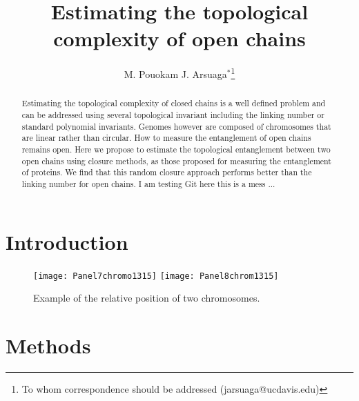 \documentclass{iopart}
\begin{document}
\title[Estimating the topological complexity of open chains]{Estimating the topological complexity of open chains}

\author{M. Pouokam J. Arsuaga$^\ast$\footnote[1]{To whom correspondence should be addressed
(jarsuaga@ucdavis.edu)}}
\address{$^\ast$Department of Mathematics \& \\
Department of Molecular and Cellular Biology\\
University of California at Davis\\
Davis, CA 95616}

\begin{abstract}
Estimating the topological complexity of closed chains is a well defined problem and can be addressed using several topological invariant including the linking number or standard polynomial invariants. Genomes however are composed of chromosomes that are linear rather than circular. How to measure the entanglement of open chains remains open. Here we propose to estimate the topological entanglement between two open chains using closure methods, as those proposed for measuring the entanglement of proteins. We find that this random closure approach performs better than the linking number for open chains. 
I am testing Git here
this is a mess ...


\end{abstract}





\section{Introduction}
\begin{figure}[!htb]
\begin{center}
\texttt{[image: Panel7chromo1315]}
\texttt{[image: Panel8chrom1315]}
\end{center}
\caption{Example of the relative position of two chromosomes.
\label{2Chroms}}
\end{figure}

\section{Methods}
\end{document}
